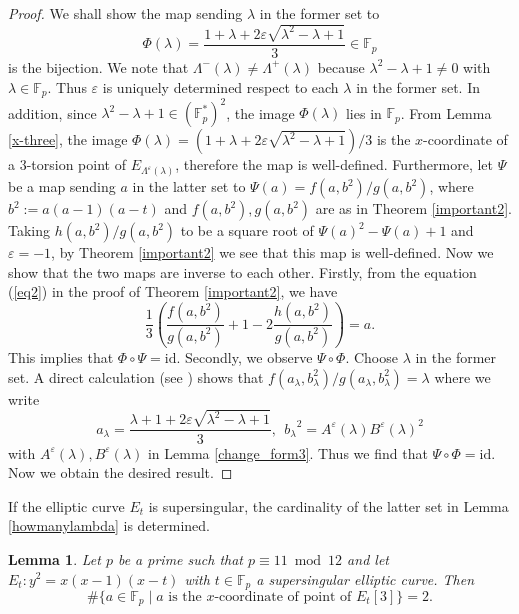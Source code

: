 \documentclass[a4paper, 11pt]{article}
\theoremstyle{plain}
\newtheorem{lem}[defn]{Lemma}
\newcommand{\?}{\textcolor{red}{??}}
\newcommand{\lm}{\lambda}
\newcommand{\Lm}{\Lambda}
\newcommand{\fp}{\mathbb{F}_p}
\begin{document}
\begin{proof}
    We shall show the map sending $ \lm$ in the former set to
    \[\Phi(\lm)=\frac{1+\lm+2\varepsilon\sqrt{\lm^2-\lm+1}}{3}\in \fp\] is the bijection. We note that $\Lm^{-}(\lm) \ne \Lm^{+}(\lm)$ because $\lm^2-\lm+1\ne 0$ with $\lm\in \fp$. Thus $\varepsilon$ is uniquely determined respect to each $\lm$ in the former set. In addition, since $\lm^2-\lm+1\in\left(\fp^*\right)^2$, the image $\Phi(\lm)$ lies in $\fp$.
    From Lemma \ref{x-three}, the image $\Phi(\lm)=(1+\lm+2\varepsilon\sqrt{\lm^2-\lm+1})/3$ is the $x$-coordinate of a $3$-torsion point of $E_{\Lm^{\varepsilon}(\lm)}$, therefore the map is well-defined. Furthermore, let $\Psi$ be a map sending $a$ in the latter set to $\Psi(a)=f(a,b^2)/g(a,b^2)$, where $b^2:=a(a-1)(a-t)$ and $f(a,b^2),g(a,b^2)$ are as in Theorem \ref{important2}. Taking $h(a,b^2)/g(a,b^2)$ to be a square root of $\Psi(a)^2-\Psi(a)+1$ and $\varepsilon=-1$, by Theorem \ref{important2} we see that this map is well-defined. 
    Now we show that the two maps are inverse to each other. Firstly, from the equation (\ref{eq2}) in the proof of Theorem \ref{important2}, we have 
    \[
   \frac{1}{3} \left(\frac{f(a,b^2)}{g(a,b^2)}+1-2\frac{h(a,b^2)}{g(a,b^2)} \right)=a.
    \]
    This implies that $\Phi\circ \Psi=\text{id}$. Secondly, we observe $\Psi\circ\Phi$. Choose $\lm$ in the former set. A direct calculation (see \cite[8]{Github}) shows that $f(a_\lm,b^2_{\lm})/g(a_\lm,b^2_{\lm})=\lm$  where we write 
    \[
    a_\lm=\frac{\lm+1+2\varepsilon\sqrt{\lm^2-\lm+1}}{3}, \ \ {b_\lm}^2=A^{\varepsilon}(\lm)B^{\varepsilon}(\lm)^2
    \]
    with $A^{\varepsilon}(\lm),B^{\varepsilon}(\lm)$ in Lemma \ref{change_form3}. Thus we find that $\Psi\circ \Phi=\text{id}$. Now we obtain the desired result. 
\end{proof}
If the elliptic curve $E_t$ is supersingular, the cardinality of the latter set in Lemma \ref{howmanylambda} is determined.
\begin{lem}
\label{exactly2}
    Let $p$ be a prime such that $p \equiv 11 \bmod 12$ and
let $E_t:y^2=x(x-1)(x-t)$ with $t \in \fp$ a supersingular elliptic curve. Then
\[
\# \{a \in \fp \mid  a \textrm{ is the } x\textrm{-coordinate of point of } E_{t}[3]\}=2.
\]
\end{lem}
\end{document}
